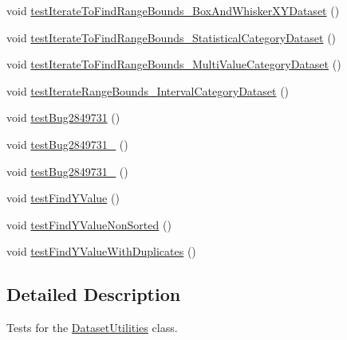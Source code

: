 \begin{DoxyCompactItemize}
\item 
void \mbox{\hyperlink{classorg_1_1jfree_1_1data_1_1general_1_1_dataset_utilities_test_a349d407c16ae126aee653c6aa6be8280}{test\+Iterate\+To\+Find\+Range\+Bounds\+\_\+\+Box\+And\+Whisker\+X\+Y\+Dataset}} ()
\item 
void \mbox{\hyperlink{classorg_1_1jfree_1_1data_1_1general_1_1_dataset_utilities_test_abf84d0acc21339de651832617b130f3e}{test\+Iterate\+To\+Find\+Range\+Bounds\+\_\+\+Statistical\+Category\+Dataset}} ()
\item 
void \mbox{\hyperlink{classorg_1_1jfree_1_1data_1_1general_1_1_dataset_utilities_test_a32b15646cf7f19633a7395dbbec5d6ed}{test\+Iterate\+To\+Find\+Range\+Bounds\+\_\+\+Multi\+Value\+Category\+Dataset}} ()
\item 
void \mbox{\hyperlink{classorg_1_1jfree_1_1data_1_1general_1_1_dataset_utilities_test_a6bd4859a53031bf3512e0372183cf37b}{test\+Iterate\+Range\+Bounds\+\_\+\+Interval\+Category\+Dataset}} ()
\item 
void \mbox{\hyperlink{classorg_1_1jfree_1_1data_1_1general_1_1_dataset_utilities_test_abcb3bfbc200fcc79e41e935eff1ccc7a}{test\+Bug2849731}} ()
\item 
void \mbox{\hyperlink{classorg_1_1jfree_1_1data_1_1general_1_1_dataset_utilities_test_a9c39a58ae940155d0b47e72fc9858aaf}{test\+Bug2849731\+\_}} ()
\item 
void \mbox{\hyperlink{classorg_1_1jfree_1_1data_1_1general_1_1_dataset_utilities_test_ac35cd57d5ecd89b7b9a9d614482adecf}{test\+Bug2849731\+\_}} ()
\item 
void \mbox{\hyperlink{classorg_1_1jfree_1_1data_1_1general_1_1_dataset_utilities_test_a774636734bff6860817b9a7fa4d534eb}{test\+Find\+Y\+Value}} ()
\item 
void \mbox{\hyperlink{classorg_1_1jfree_1_1data_1_1general_1_1_dataset_utilities_test_ad2e8f9e20ab332cadc66017a1adff9af}{test\+Find\+Y\+Value\+Non\+Sorted}} ()
\item 
void \mbox{\hyperlink{classorg_1_1jfree_1_1data_1_1general_1_1_dataset_utilities_test_ad7c287cf96264d42a35397c4c8d7798b}{test\+Find\+Y\+Value\+With\+Duplicates}} ()
\end{DoxyCompactItemize}


\subsection{Detailed Description}
Tests for the \mbox{\hyperlink{classorg_1_1jfree_1_1data_1_1general_1_1_dataset_utilities}{Dataset\+Utilities}} class. 

